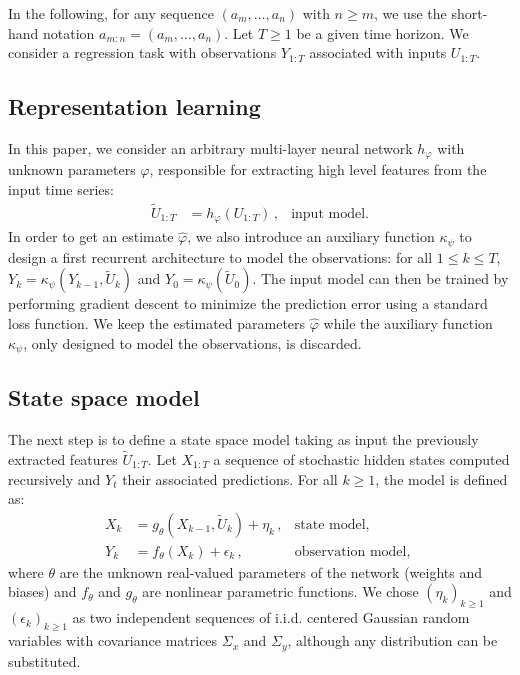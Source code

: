 \documentclass[conference]{IEEEtran}
\begin{document}
In the following, for any sequence $(a_m,\ldots, a_n)$ with $n\geq m$, we use the short-hand notation $a_{m:n} = (a_m,\ldots, a_n)$.
Let $T\ge 1$ be a given time horizon.
We consider a regression task with observations $Y_{1:T}$ associated with inputs $U_{1:T}$.

\subsection{Representation learning}%
In this paper, we consider an arbitrary multi-layer neural network $h_\varphi$ with unknown parameters $\varphi$, responsible for extracting high level features from the input time series:
\begin{align*}
	\widetilde U_{1:T} & = h_\varphi(U_{1:T})\,, & \text{input model.}
\end{align*}
In order to get an estimate $\hat \varphi$, we also introduce an auxiliary function $\kappa_\psi$ to design a first recurrent architecture to model the observations: for all $1 \leq k \leq T$, $Y_k = \kappa_\psi(Y_{k-1}, \widetilde U_k)$ and $Y_0 = \kappa_\psi(\widetilde U_0)$.
The input model can then be trained by performing gradient descent to minimize the prediction error using a standard loss function.
We keep the estimated parameters $\hat \varphi$ while the auxiliary function $\kappa_\psi$, only designed to model the observations, is discarded.

\subsection{State space model}
\label{sub:proposed_architecture}
The next step is to define  a state space model taking as input the previously extracted features $\widetilde U_{1:T}$.
Let $X_{1:T}$ a sequence of stochastic hidden states computed recursively and $Y_t$ their associated predictions.
For all $k \geq 1$, the model is defined as:
\begin{align*}
	X_k & = g_\theta(X_{k-1}, \widetilde U_k) + \eta_k\,, & \text{state model, }       \\
	Y_k & = f_\theta(X_k) + \epsilon_k\,,                 & \text{observation model, }
\end{align*}
where $\theta$ are the unknown real-valued parameters of the network (weights and biases) and $f_\theta$ and $g_\theta$ are nonlinear parametric functions.
We chose $(\eta_k)_{k\geq 1}$ and $(\epsilon_k)_{k\geq 1}$ as two independent sequences of i.i.d. centered Gaussian random variables with covariance matrices $\Sigma_x$ and $\Sigma_y$, although any distribution can be substituted.
\end{document}
